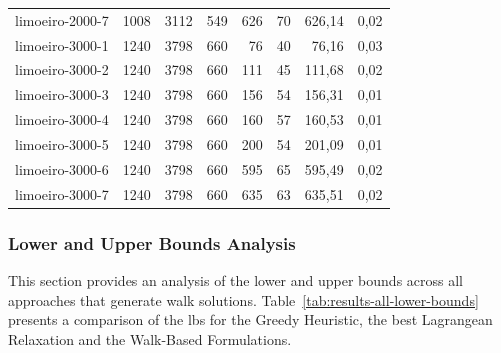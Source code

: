 \begin{table}[ht!]
{\begin{tabular}{lrrr|rr|rr}
			limoeiro-2000-7                                                                                      & 1008 & 3112 & 549 & 626 & 70 & 626,14 & 0,02 \\
			limoeiro-3000-1                                                                                      & 1240 & 3798 & 660 & 76  & 40 & 76,16  & 0,03 \\
			limoeiro-3000-2                                                                                      & 1240 & 3798 & 660 & 111 & 45 & 111,68 & 0,02 \\
			limoeiro-3000-3                                                                                      & 1240 & 3798 & 660 & 156 & 54 & 156,31 & 0,01 \\
			limoeiro-3000-4                                                                                      & 1240 & 3798 & 660 & 160 & 57 & 160,53 & 0,01 \\
			limoeiro-3000-5                                                                                      & 1240 & 3798 & 660 & 200 & 54 & 201,09 & 0,01 \\
			limoeiro-3000-6                                                                                      & 1240 & 3798 & 660 & 595 & 65 & 595,49 & 0,02 \\
			limoeiro-3000-7                                                                                      & 1240 & 3798 & 660 & 635 & 63 & 635,51 & 0,02 \\
			\bottomrule
		\end{tabular}%
	}
\end{table}

\subsubsection{Lower and Upper Bounds Analysis}\label{subsec:lower-and-upper-bounds-analysis}

This section provides an analysis of the lower and upper bounds across all approaches that generate walk solutions. Table~\ref{tab:results-all-lower-bounds} presents a comparison of the \gls{lb}s for the Greedy Heuristic, the best Lagrangean Relaxation and the Walk-Based Formulations.

